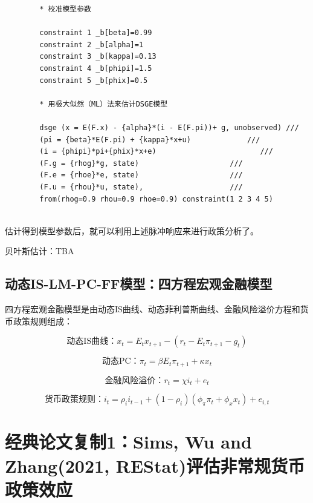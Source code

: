 \documentclass[cn,12pt,math=newtx,citestyle=gb7714-2015,bibstyle=gb7714-2015]{elegantbook}
\begin{document}
	\begin{lstlisting}
		* 校准模型参数
		
		constraint 1 _b[beta]=0.99
		constraint 2 _b[alpha]=1
		constraint 3 _b[kappa]=0.13
		constraint 4 _b[phipi]=1.5
		constraint 5 _b[phix]=0.5
		
		* 用极大似然（ML）法来估计DSGE模型
		
		dsge (x = E(F.x) - {alpha}*(i - E(F.pi))+ g, unobserved) ///
		(pi = {beta}*E(F.pi) + {kappa}*x+u)             ///
		(i = {phipi}*pi+{phix}*x+e)                        ///
		(F.g = {rhog}*g, state)                     ///
		(F.e = {rhoe}*e, state)                     ///
		(F.u = {rhou}*u, state),                    ///
		from(rhog=0.9 rhou=0.9 rhoe=0.9) constraint(1 2 3 4 5)
		
	\end{lstlisting}
	
	估计得到模型参数后，就可以利用上述脉冲响应来进行政策分析了。
	
	贝叶斯估计：TBA
	
	
	
	
	\subsection{动态IS-LM-PC-FF模型：四方程宏观金融模型}
	
	四方程宏观金融模型是由动态IS曲线、动态菲利普斯曲线、金融风险溢价方程和货币政策规则组成：
	
		\begin{equation}
		\text{动态IS曲线：}x_t = E_t x_{t+1} - (r_t - E_t\pi_{t+1} - g_t)
	\end{equation}
	
	
	\begin{equation}
		\text{动态PC：}\pi_t =\beta E_t \pi_{t+1} + \kappa x_t
	\end{equation}
	
		\begin{equation}
		\text{金融风险溢价：}r_t =\chi i_{t} + e_t
	\end{equation}
	
	\begin{equation}
		\text{货币政策规则：} i_t =\rho_i i_{t-1} + (1-\rho_i)(\phi_\pi \pi_{t} + \phi_x x_t) + e_{i,t}
	\end{equation}
	
		
	
	\section{经典论文复制1：Sims, Wu and Zhang(2021, REStat)评估非常规货币政策效应}
	
\end{document}
